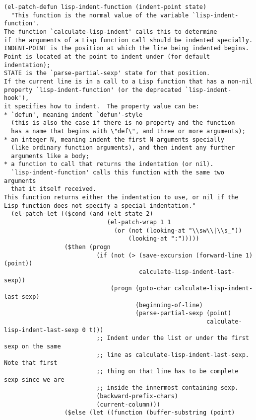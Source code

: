 \documentclass[11pt]{article}
\begin{document}
\begin{enumerate}
\begin{verbatim}
(el-patch-defun lisp-indent-function (indent-point state)
  "This function is the normal value of the variable `lisp-indent-function'.
The function `calculate-lisp-indent' calls this to determine
if the arguments of a Lisp function call should be indented specially.
INDENT-POINT is the position at which the line being indented begins.
Point is located at the point to indent under (for default indentation);
STATE is the `parse-partial-sexp' state for that position.
If the current line is in a call to a Lisp function that has a non-nil
property `lisp-indent-function' (or the deprecated `lisp-indent-hook'),
it specifies how to indent.  The property value can be:
* `defun', meaning indent `defun'-style
  (this is also the case if there is no property and the function
  has a name that begins with \"def\", and three or more arguments);
* an integer N, meaning indent the first N arguments specially
  (like ordinary function arguments), and then indent any further
  arguments like a body;
* a function to call that returns the indentation (or nil).
  `lisp-indent-function' calls this function with the same two arguments
  that it itself received.
This function returns either the indentation to use, or nil if the
Lisp function does not specify a special indentation."
  (el-patch-let (($cond (and (elt state 2)
                             (el-patch-wrap 1 1
                               (or (not (looking-at "\\sw\\|\\s_"))
                                   (looking-at ":")))))
                 ($then (progn
                          (if (not (> (save-excursion (forward-line 1) (point))
                                      calculate-lisp-indent-last-sexp))
                              (progn (goto-char calculate-lisp-indent-last-sexp)
                                     (beginning-of-line)
                                     (parse-partial-sexp (point)
                                                         calculate-lisp-indent-last-sexp 0 t)))
                          ;; Indent under the list or under the first sexp on the same
                          ;; line as calculate-lisp-indent-last-sexp.  Note that first
                          ;; thing on that line has to be complete sexp since we are
                          ;; inside the innermost containing sexp.
                          (backward-prefix-chars)
                          (current-column)))
                 ($else (let ((function (buffer-substring (point)

\end{verbatim}
\end{enumerate}
\end{document}
